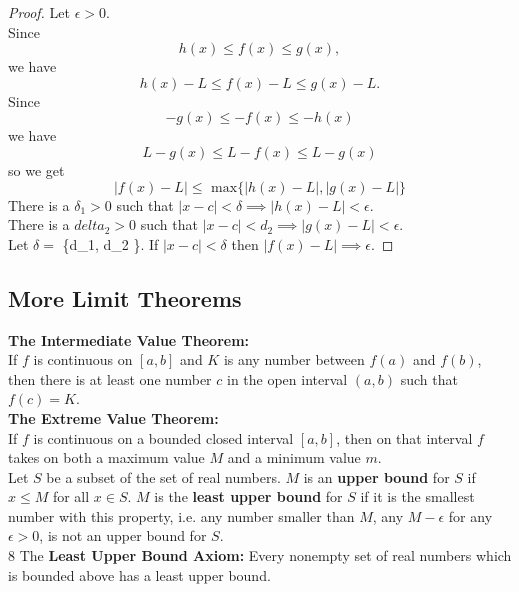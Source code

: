         \begin{proof}
            Let $\epsilon > 0$. \\
            Since
            \[
                h(x) \leq f(x) \leq g(x),
            \]
            we have
            \[
                h(x) - L \leq f(x) - L \leq g(x) - L.
            \]
            Since
            \[
                -g(x) \leq - f(x) \leq - h(x)
            \]
            we have
            \[
                L - g(x) \leq L - f(x) \leq L - g(x)
            \]
            so we get
            \[
                |f(x)-L| \leq \text{ max}\{|h(x)-L|, |g(x)-L|\}
            \]
            There is a $\delta_1 > 0$ such that $|x-c| < \delta\implies |h(x)-L| < \epsilon$. \\
            There is a $delta_2 > 0$ such that $|x-c| < d_2 \implies |g(x) - L| < \epsilon$. \\
            Let $\delta = $ \{d_1, d_2 \}. If $|x-c| < \delta$ then $|f(x) - L|\implies \epsilon$.
        \end{proof}

    \subsection{More Limit Theorems}

        \textbf{The Intermediate Value Theorem:} \\
        If $f$ is continuous on $[a,b]$ and $K$ is any number between $f(a)$ and $f(b)$, then there is at least one number $c$ in the open interval $(a,b)$ such that $f(c)=K$. \\

        \textbf{The Extreme Value Theorem:} \\
        If $f$ is continuous on a bounded closed interval $[a,b]$, then on that interval $f$ takes on both a maximum value $M$ and a minimum value $m$. \\



        Let $S$ be a subset of the set of real numbers. $M$ is an \textbf{upper bound} for $S$ if $x\leq M$ for all $x\in S$. $M$ is the \textbf{least upper bound} for $S$ if it is the smallest number with this property,
        i.e. any number smaller than $M$, any $M-\epsilon$ for any $\epsilon>0$, is not an upper bound for $S$. \\
8
        The \textbf{Least Upper Bound Axiom:} Every nonempty set of real numbers which is bounded above has a least upper bound.



